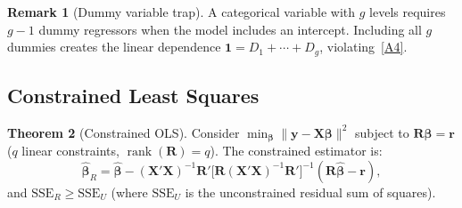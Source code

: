\documentclass[12pt,a4paper]{article}
\theoremstyle{definition}
\newtheorem{theorem}{Theorem}[section]
\newtheorem{remark}[theorem]{Remark}
\DeclareMathOperator\rank{rank}
\newcommand{\SSE}{\mathrm{SSE}}
\newcommand{\bX}{\mathbf{X}}
\newcommand{\by}{\mathbf{y}}
\def\bb{\boldsymbol{\beta}}
\newcommand{\bR}{\mathbf{R}}
\newcommand{\br}{\mathbf{r}}
\newcommand{\bone}{\mathbf{1}}
\begin{document}
\begin{remark}[Dummy variable trap]\label{rem:dummy-trap}
A categorical variable with $g$ levels requires $g-1$ dummy regressors when the model includes an intercept. Including all $g$ dummies creates the linear dependence $\bone = D_1 + \cdots + D_g$, violating~\ref{A4}.
\end{remark}

\subsection{Constrained Least Squares}

\begin{theorem}[Constrained OLS]\label{thm:cls}
Consider $\min_{\bb} \|\by - \bX\bb\|^2$ subject to $\bR\bb = \br$ ($q$ linear constraints, $\rank(\bR) = q$). The constrained estimator is:
\begin{equation}\label{eq:cls}
\hat{\bb}_R = \hat{\bb} - (\bX'\bX)^{-1}\bR'\bigl[\bR(\bX'\bX)^{-1}\bR'\bigr]^{-1}(\bR\hat{\bb} - \br),
\end{equation}
and $\SSE_R \geqslant \SSE_U$ (where $\SSE_U$ is the unconstrained residual sum of squares).
\end{theorem}
\end{document}

